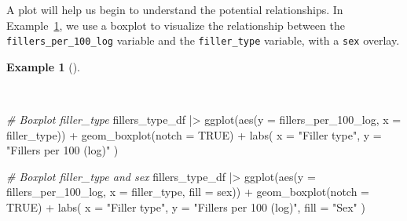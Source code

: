 \documentclass[
  letterpaper,
]{latex/krantz}
\newenvironment{Shaded}{\begin{snugshade}}{\end{snugshade}}
\newcommand{\AttributeTok}[1]{\textcolor[rgb]{0.00,0.00,0.00}{#1}}
\newcommand{\CommentTok}[1]{\textcolor[rgb]{0.00,0.00,0.00}{\textit{#1}}}
\newcommand{\ConstantTok}[1]{\textcolor[rgb]{0.00,0.00,0.00}{#1}}
\newcommand{\FunctionTok}[1]{\textcolor[rgb]{0.00,0.00,0.00}{#1}}
\newcommand{\NormalTok}[1]{\textcolor[rgb]{0.00,0.00,0.00}{#1}}
\newcommand{\SpecialCharTok}[1]{\textcolor[rgb]{0.00,0.00,0.00}{#1}}
\newcommand{\StringTok}[1]{\textcolor[rgb]{0.00,0.00,0.00}{#1}}
\theoremstyle{definition}
\newtheorem{example}{Example}[chapter]
\theoremstyle{remark}
\begin{document}
A plot will help us begin to understand the potential relationships. In
Example~\ref{exm-ida-multi-sex-plot}, we use a boxplot to visualize the
relationship between the \texttt{fillers\_per\_100\_log} variable and
the \texttt{filler\_type} variable, with a \texttt{sex} overlay.

\begin{example}[]\protect\hypertarget{exm-ida-multi-sex-plot}{}\label{exm-ida-multi-sex-plot}

~

\begin{Shaded}
\begin{Highlighting}[]
\CommentTok{\# Boxplot \textasciigrave{}filler\_type\textasciigrave{}}
\NormalTok{fillers\_type\_df }\SpecialCharTok{|\textgreater{}}
  \FunctionTok{ggplot}\NormalTok{(}\FunctionTok{aes}\NormalTok{(}\AttributeTok{y =}\NormalTok{ fillers\_per\_100\_log, }\AttributeTok{x =}\NormalTok{ filler\_type)) }\SpecialCharTok{+}
  \FunctionTok{geom\_boxplot}\NormalTok{(}\AttributeTok{notch =} \ConstantTok{TRUE}\NormalTok{) }\SpecialCharTok{+}
  \FunctionTok{labs}\NormalTok{(}
    \AttributeTok{x =} \StringTok{"Filler type"}\NormalTok{,}
    \AttributeTok{y =} \StringTok{"Fillers per 100 (log)"}
\NormalTok{  )}

\CommentTok{\# Boxplot \textasciigrave{}filler\_type\textasciigrave{} and \textasciigrave{}sex\textasciigrave{}}
\NormalTok{fillers\_type\_df }\SpecialCharTok{|\textgreater{}}
  \FunctionTok{ggplot}\NormalTok{(}\FunctionTok{aes}\NormalTok{(}\AttributeTok{y =}\NormalTok{ fillers\_per\_100\_log, }\AttributeTok{x =}\NormalTok{ filler\_type, }\AttributeTok{fill =}\NormalTok{ sex)) }\SpecialCharTok{+}
  \FunctionTok{geom\_boxplot}\NormalTok{(}\AttributeTok{notch =} \ConstantTok{TRUE}\NormalTok{) }\SpecialCharTok{+}
  \FunctionTok{labs}\NormalTok{(}
    \AttributeTok{x =} \StringTok{"Filler type"}\NormalTok{,}
    \AttributeTok{y =} \StringTok{"Fillers per 100 (log)"}\NormalTok{,}
    \AttributeTok{fill =} \StringTok{"Sex"}
\NormalTok{  )}
\end{Highlighting}
\end{Shaded}

\begin{figure}[H]

\begin{minipage}{0.50\linewidth}

\centering{

}
\end{minipage}
\end{figure}
\end{example}
\end{document}
